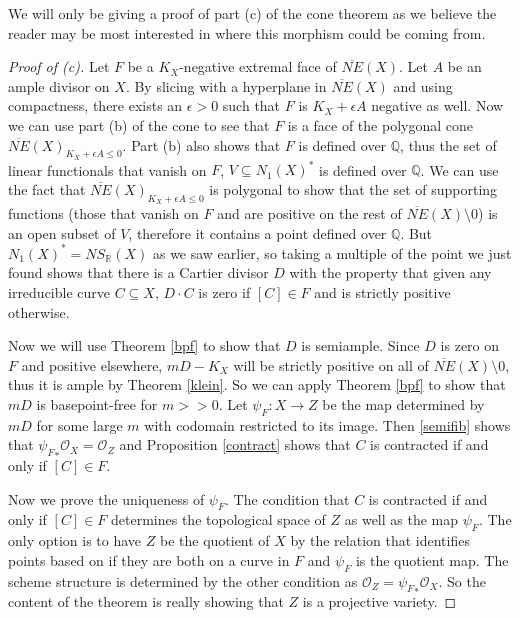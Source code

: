 \documentclass[a4paper]{article}
\newcommand{\Oc}{\mathcal{O}}
\numberwithin{theorem}{section}
\begin{document}
We will only be giving a proof of part (c) of the cone theorem as we believe the reader may be most interested in where this morphism could be coming from.

\begin{proof}[Proof of (c)]
Let $F$ be a $K_X$-negative extremal face of $\overline{NE}(X)$. Let $A$ be an ample divisor on $X$. By slicing with a hyperplane in $\overline{NE}(X)$ and using compactness, there exists an $\epsilon > 0$ such that $F$ is $K_X + \epsilon A$ negative as well. Now we can use part (b) of the cone to see that $F$ is a face of the polygonal cone $\overline{NE}(X)_{K_X + \epsilon A \leq 0}$. Part (b) also shows that $F$ is defined over $\mathbb{Q}$, thus the set of linear functionals that vanish on $F$, $V \subseteq N_1(X)^*$ is defined over $\mathbb{Q}$. We can use the fact that $\overline{NE}(X)_{K_X + \epsilon A \leq 0}$ is polygonal to show that the set of supporting functions (those that vanish on $F$ and are positive on the rest of $\overline{NE}(X) \setminus 0$) is an open subset of $V$, therefore it contains a point defined over $\mathbb{Q}$. But $N_1(X)^* = NS_{\mathbb{R}}(X)$ as we saw earlier, so taking a multiple of the point we just found shows that there is a Cartier divisor $D$ with the property that given any irreducible curve $C \subseteq X$, $D \cdot C$ is zero if $[C] \in F$ and is strictly positive otherwise.

Now we will use Theorem \ref{bpf} to show that $D$ is semiample. Since $D$ is zero on $F$ and positive elsewhere, $mD - K_X$ will be strictly positive on all of $\overline{NE}(X) \setminus 0$, thus it is ample by Theorem \ref{klein}. So we can apply Theorem \ref{bpf} to show that $mD$ is basepoint-free for $m >> 0$. Let $\psi_F: X \rightarrow Z$ be the map determined by $mD$ for some large $m$ with codomain restricted to its image. Then \ref{semifib} shows that ${\psi_F}_* \Oc_X = \Oc_Z$ and Proposition \ref{contract} shows that $C$ is contracted if and only if $[C] \in F$.

Now we prove the uniqueness of $\psi_F$. The condition that $C$ is contracted if and only if $[C] \in F$ determines the topological space of $Z$ as well as the map $\psi_F$. The only option is to have $Z$ be the quotient of $X$ by the relation that identifies points based on if they are both on a curve in $F$ and $\psi_F$ is the quotient map. The scheme structure is determined by the other condition as $\Oc_Z = {\psi_F}_* \Oc_X$. So the content of the theorem is really showing that $Z$ is a projective variety.

\end{proof}
\end{document}
